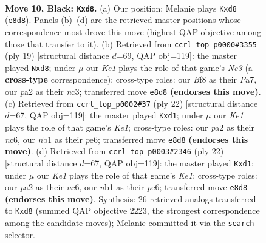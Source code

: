 \documentclass[11pt]{article}
\begin{document}
\clearpage

\begin{figure}[p]\centering
\begin{subfigure}{0.46\textwidth}\centering
\resizebox{\linewidth}{!}{%
\newchessgame
\chessboard[
  setfen={r1bQkb1r/ppp2ppp/2P5/8/8/8/PPP2PpP/RNB1K2R b KQkq - 0 10},
  showmover=false,
  pgfstyle=straightmove, color=movearrow, markmove={e8-d8}
]}
\caption{}
\end{subfigure}\hfill
\begin{subfigure}{0.46\textwidth}\centering
\resizebox{\linewidth}{!}{%
\newchessgame
\chessboard[
  setfen={r1bQk2r/ppp2ppp/2n5/8/2p1P3/2N5/PP3PPP/R3KB1R b KQkq - 0 10},
  showmover=false,
  pgfstyle=straightmove, color=movearrow, markmove={c6-d8}
]}
\caption{}
\end{subfigure}
\\[4pt]
\begin{subfigure}{0.46\textwidth}\centering
\resizebox{\linewidth}{!}{%
\newchessgame
\chessboard[
  setfen={r1b1k2r/pp3ppp/2n1p3/8/4B3/P7/1PP2PPP/R1BqK2R w KQkq - 0 12},
  showmover=false,
  pgfstyle=straightmove, color=movearrow, markmove={e1-d1}
]}
\caption{}
\end{subfigure}\hfill
\begin{subfigure}{0.46\textwidth}\centering
\resizebox{\linewidth}{!}{%
\newchessgame
\chessboard[
  setfen={r1b1k2r/pp3ppp/2n1p3/8/4B3/P7/1PP2PPP/R1BqK2R w KQkq - 0 12},
  showmover=false,
  pgfstyle=straightmove, color=movearrow, markmove={e1-d1}
]}
\caption{}
\end{subfigure}
\caption{\textbf{Move 10, Black: \texttt{Kxd8}.} (a) Our position; Melanie plays \texttt{Kxd8} (\texttt{e8d8}). Panels (b)--(d) are the retrieved master positions whose correspondence most drove this move (highest QAP objective among those that transfer to it). (b) Retrieved from \texttt{ccrl\_top\_p0000\#3355} (ply 19) [structural distance $d$=69, QAP obj=119]: the master played \texttt{Nxd8}; under $\mu$ our \emph{Ke1} plays the role of that game's \emph{Nc3} (a \textbf{cross-type} correspondence); cross-type roles: our \emph{B}f8 as their \emph{P}a7, our \emph{p}a2 as their \emph{n}c3; transferred move \texttt{e8d8} \textbf{(endorses this move)}. (c) Retrieved from \texttt{ccrl\_top\_p0002\#37} (ply 22) [structural distance $d$=67, QAP obj=119]: the master played \texttt{Kxd1}; under $\mu$ our \emph{Ke1} plays the role of that game's \emph{Ke1}; cross-type roles: our \emph{p}a2 as their \emph{n}c6, our \emph{n}b1 as their \emph{p}e6; transferred move \texttt{e8d8} \textbf{(endorses this move)}. (d) Retrieved from \texttt{ccrl\_top\_p0003\#2346} (ply 22) [structural distance $d$=67, QAP obj=119]: the master played \texttt{Kxd1}; under $\mu$ our \emph{Ke1} plays the role of that game's \emph{Ke1}; cross-type roles: our \emph{p}a2 as their \emph{n}c6, our \emph{n}b1 as their \emph{p}e6; transferred move \texttt{e8d8} \textbf{(endorses this move)}. Synthesis: 26 retrieved analogs transferred to \texttt{Kxd8} (summed QAP objective 2223, the strongest correspondence among the candidate moves); Melanie committed it via the \texttt{search} selector.}
\label{fig:thought-m19}
\end{figure}
\end{document}
